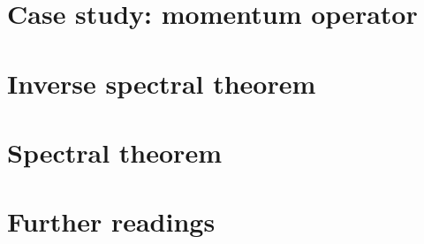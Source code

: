 \documentclass[a4paper,11pt]{article}
\theoremstyle{definition} %
\theoremstyle{plain} %
\theoremstyle{remark} %
\theoremstyle{underline}
\begin{document}
\section{Case study: momentum operator}

\newpage

\section{Inverse spectral theorem}

\newpage

\section{Spectral theorem}

\newpage

\section*{Further readings}

\newpage

 \printindex
\end{document}
